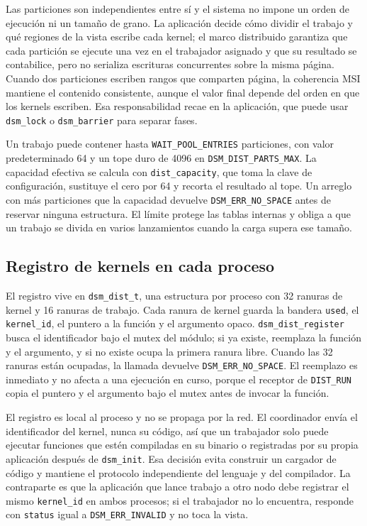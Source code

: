 Las particiones son independientes entre sí y el sistema no impone un orden de ejecución ni un tamaño de grano. La aplicación decide cómo dividir el trabajo y qué regiones de la vista escribe cada kernel; el marco distribuido garantiza que cada partición se ejecute una vez en el trabajador asignado y que su resultado se contabilice, pero no serializa escrituras concurrentes sobre la misma página. Cuando dos particiones escriben rangos que comparten página, la coherencia MSI mantiene el contenido consistente, aunque el valor final depende del orden en que los kernels escriben. Esa responsabilidad recae en la aplicación, que puede usar \texttt{dsm\_lock} o \texttt{dsm\_barrier} para separar fases.

Un trabajo puede contener hasta \texttt{WAIT\_POOL\_ENTRIES} particiones, con valor predeterminado 64 y un tope duro de 4096 en \texttt{DSM\_DIST\_PARTS\_MAX}. La capacidad efectiva se calcula con \texttt{dist\_capacity}, que toma la clave de configuración, sustituye el cero por 64 y recorta el resultado al tope. Un arreglo con más particiones que la capacidad devuelve \texttt{DSM\_ERR\_NO\_SPACE} antes de reservar ninguna estructura. El límite protege las tablas internas y obliga a que un trabajo se divida en varios lanzamientos cuando la carga supera ese tamaño.

\subsection{Registro de kernels en cada proceso}

El registro vive en \texttt{dsm\_dist\_t}, una estructura por proceso con 32 ranuras de kernel y 16 ranuras de trabajo. Cada ranura de kernel guarda la bandera \texttt{used}, el \texttt{kernel\_id}, el puntero a la función y el argumento opaco. \texttt{dsm\_dist\_register} busca el identificador bajo el mutex del módulo; si ya existe, reemplaza la función y el argumento, y si no existe ocupa la primera ranura libre. Cuando las 32 ranuras están ocupadas, la llamada devuelve \texttt{DSM\_ERR\_NO\_SPACE}. El reemplazo es inmediato y no afecta a una ejecución en curso, porque el receptor de \texttt{DIST\_RUN} copia el puntero y el argumento bajo el mutex antes de invocar la función.

El registro es local al proceso y no se propaga por la red. El coordinador envía el identificador del kernel, nunca su código, así que un trabajador solo puede ejecutar funciones que estén compiladas en su binario o registradas por su propia aplicación después de \texttt{dsm\_init}. Esa decisión evita construir un cargador de código y mantiene el protocolo independiente del lenguaje y del compilador. La contraparte es que la aplicación que lance trabajo a otro nodo debe registrar el mismo \texttt{kernel\_id} en ambos procesos; si el trabajador no lo encuentra, responde con \texttt{status} igual a \texttt{DSM\_ERR\_INVALID} y no toca la vista.

